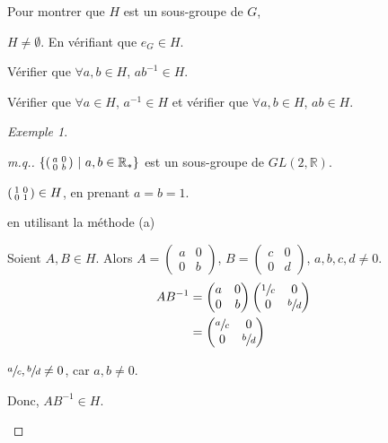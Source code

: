 \documentclass{report}
\newcommand*{\reels}{\mathbb{R}}
\theoremstyle{definition}
\theoremstyle{remark}
\newtheorem*{exem}{Exemple}
\begin{document}
	Pour montrer que $H$ est un sous-groupe de $G$,
	\begin{nlist}
		\item $H \neq \emptyset$. En v\'erifiant que $e_G \in H$.
		\item \begin{nlist}
			\item V\'erifier que $\forall a,b \in H$, $ab^{-1} \in H$.
			\item V\'erifier que $\forall a \in H$, $a^{-1} \in H$ et v\'erifier que $\forall a,b \in H$, $ab \in H$.
		\end{nlist}
	\end{nlist}
	\begin{exem}~

		\begin{proof}[m.q.]
			$\left\{ \begin{psmallmatrix}
				a&0\\0&b
			\end{psmallmatrix} ~\middle|~ a,b \in \reels_* \right\}$ est un sous-groupe de $GL(2,\reels)$.
			\begin{ulist}
				\item $\begin{psmallmatrix}
					1&0\\0&1
				\end{psmallmatrix} \in H$, en prenant $a=b=1$.
				\item en utilisant la m\'ethode (a)

				Soient $A,B \in H$. Alors $A = \begin{pmatrix}
					a&0\\0&b
				\end{pmatrix}$, $B = \begin{pmatrix}
					c&0\\0&d
				\end{pmatrix}$, $a,b,c,d \neq 0$.
				\begin{align*}
					AB^{-1}&= \begin{pmatrix}
						a&0\\0&b
					\end{pmatrix} \begin{pmatrix}
						\sfrac{1}{c}&0\\0&\sfrac{b}{d}
					\end{pmatrix}\\
					&= \begin{pmatrix}
						\sfrac{a}{c}&0\\0&\sfrac{b}{d}
					\end{pmatrix}
				\end{align*}

				$\sfrac{a}{c}, \sfrac{b}{d} \neq 0$, car $a,b \neq 0$.

				Donc, $AB^{-1} \in H$.
			\end{ulist}
		\end{proof}
	\end{exem}
\end{document}
